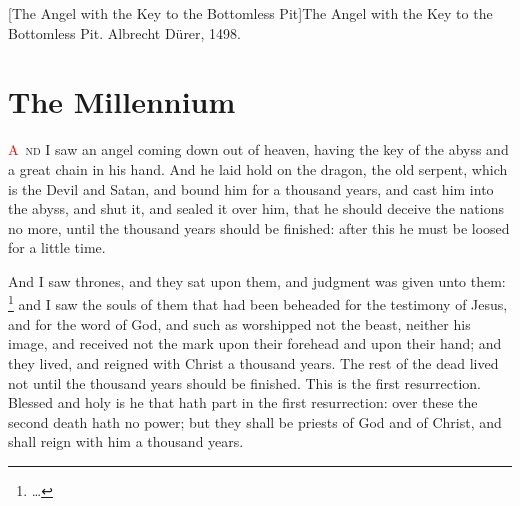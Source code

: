 [The Angel with the Key to the Bottomless Pit]{The Angel with the Key to the Bottomless Pit. Albrecht Dürer, 1498.}

\chapter{The Millennium}
\lettrine[lines=3,slope=0.5em]{\textcolor{red}{A}}{\ nd} I saw an angel coming down out of heaven, having the key of the abyss and a great chain in his hand. 
 And he laid hold on the dragon, the old serpent, which is the Devil and Satan, and bound him for a thousand years, 
 and cast him into the abyss, and shut it,%
 and sealed it over him, that he should deceive the nations no more, until the thousand years should be finished: after this he must be loosed for a little time.

 And I saw thrones, and they sat upon them, and judgment was given unto them:%
	\footnote{\ldots %
			  } %
 and I saw the souls of them that had been beheaded for the testimony of Jesus, and for the word of God, and such as worshipped not the beast, neither his image, and received not the mark upon their forehead and upon their hand; and they lived,%
 and reigned with Christ a thousand years.%
 The rest of the dead lived not until the thousand years should be finished. This is the first resurrection. 
 Blessed and holy is he that hath part in the first resurrection: over these the second death hath no power; but they shall be priests of God and of Christ, and shall reign with him a thousand years.

